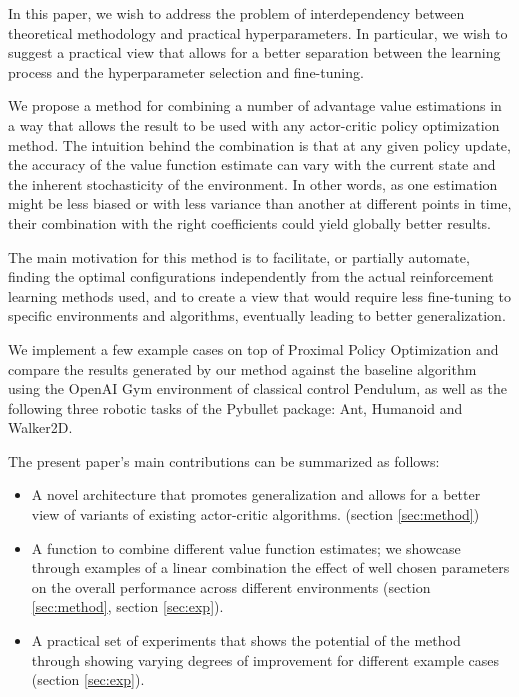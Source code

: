 In this paper, we wish to address the problem of interdependency between theoretical methodology and practical hyperparameters. In particular, we wish to suggest a practical view that allows for a better separation between the learning process and the hyperparameter selection and fine-tuning. 

We propose a method for combining a number of advantage value estimations in a way that allows the result to be used with any actor-critic policy optimization method. The intuition behind the combination is that at any given policy update, the accuracy of the value function estimate can vary with the current state and the inherent stochasticity of the environment. In other words, as one estimation might be less biased or with less variance than another at different points in time, their combination with the right coefficients could yield globally better results. 

The main motivation for this method is to facilitate, or partially automate, finding the optimal configurations independently from the actual reinforcement learning methods used, and to create a view that would require less fine-tuning to specific environments and algorithms, eventually leading to better generalization.

We implement a few example cases on top of Proximal Policy Optimization \cite{schulman2017proximal} and compare the results generated by our method against the baseline algorithm using the OpenAI Gym environment of classical control Pendulum, as well as the following three robotic tasks of the Pybullet package: Ant, Humanoid and Walker2D.

The present paper's main contributions can be summarized as follows:
\begin{itemize}
\item A novel architecture that promotes generalization and allows for a better view of variants of existing actor-critic algorithms. (section \ref{sec:method})
\item A function to combine different value function estimates; we showcase through examples of a linear combination the effect of well chosen parameters on the overall performance across different environments (section \ref{sec:method}, section \ref{sec:exp}).
\item A practical set of experiments that shows the potential of the method through showing varying degrees of improvement for different example cases (section \ref{sec:exp}). 
\end{itemize}

